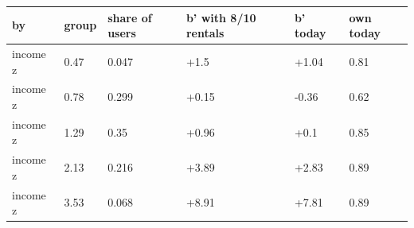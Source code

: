 \begingroup\small
\setlength{\tabcolsep}{3pt}
\renewcommand{\arraystretch}{1.04}
\begin{tabularx}{\linewidth}{XXXXXX}
\toprule
by & group & share of users & b' with 8/10 rentals & b' today & own today \\
\midrule
income z & 0.47 & 0.047 & +1.5 & +1.04 & 0.81 \\
income z & 0.78 & 0.299 & +0.15 & -0.36 & 0.62 \\
income z & 1.29 & 0.35 & +0.96 & +0.1 & 0.85 \\
income z & 2.13 & 0.216 & +3.89 & +2.83 & 0.89 \\
income z & 3.53 & 0.068 & +8.91 & +7.81 & 0.89 \\
\bottomrule
\end{tabularx}
\endgroup
